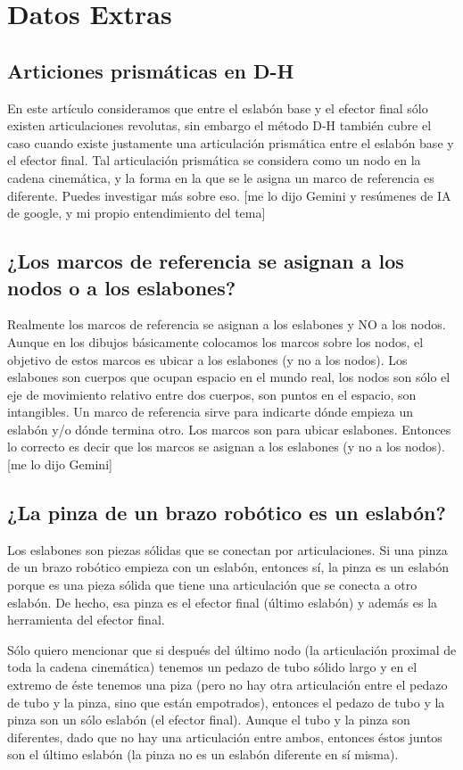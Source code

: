 \section{Datos Extras}
\subsection{Articiones prismáticas en D-H}
En este artículo consideramos que entre el eslabón base y el efector final sólo existen articulaciones revolutas, sin embargo el método D-H también cubre el caso cuando existe justamente una articulación prismática entre el eslabón base y el efector final. Tal articulación prismática se considera como un nodo en la cadena cinemática, y la forma en la que se le asigna un marco de referencia es diferente. Puedes investigar más sobre eso. [me lo dijo Gemini y resúmenes de IA de google, y mi propio entendimiento del tema]
\subsection{¿Los marcos de referencia se asignan a los nodos o a los eslabones?}
Realmente los marcos de referencia se asignan a los eslabones y NO a los nodos. Aunque en los dibujos básicamente colocamos los marcos sobre los nodos, el objetivo de estos marcos es ubicar a los eslabones (y no a los nodos). Los eslabones son cuerpos que ocupan espacio en el mundo real, los nodos son sólo el eje de movimiento relativo entre dos cuerpos, son puntos en el espacio, son intangibles. Un marco de referencia sirve para indicarte dónde empieza un eslabón y/o dónde termina otro. Los marcos son para ubicar eslabones. Entonces lo correcto es decir que los marcos se asignan a los eslabones (y no a los nodos). [me lo dijo Gemini]
\subsection{¿La pinza de un brazo robótico es un eslabón?}
Los eslabones son piezas sólidas que se conectan por articulaciones. Si una pinza de un brazo robótico empieza con un eslabón, entonces sí, la pinza es un eslabón porque es una pieza sólida que tiene una articulación que se conecta a otro eslabón. De hecho, esa pinza es el efector final (último eslabón) y además es la herramienta del efector final.

Sólo quiero mencionar que si después del último nodo (la articulación proximal de toda la cadena cinemática) tenemos un pedazo de tubo sólido largo y en el extremo de éste tenemos una piza (pero no hay otra articulación entre el pedazo de tubo y la pinza, sino que están empotrados), entonces el pedazo de tubo y la pinza son un sólo eslabón (el efector final). Aunque el tubo y la pinza son diferentes, dado que no hay una articulación entre ambos, entonces éstos juntos son el último eslabón (la pinza no es un eslabón diferente en sí misma). 
